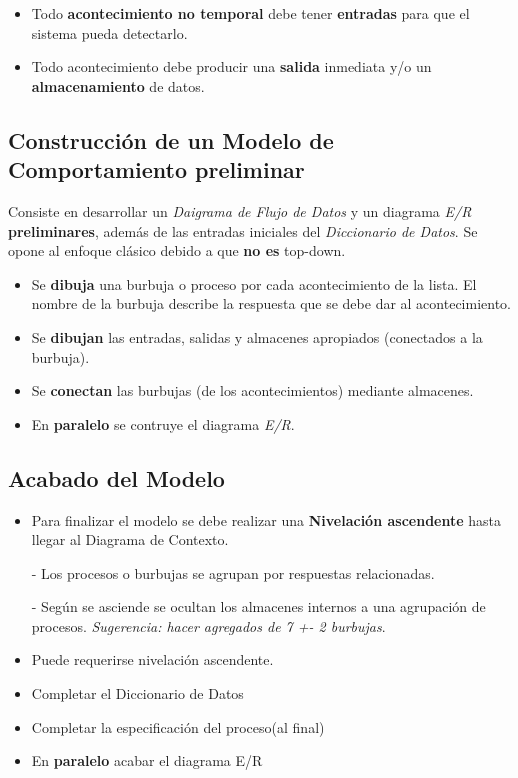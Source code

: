 \begin{itemize}[noitemsep]
\item Todo \textbf{acontecimiento no temporal} debe tener \textbf{entradas} para que el sistema pueda detectarlo.
\item Todo acontecimiento debe producir una \textbf{salida} inmediata y/o un \textbf{almacenamiento} de datos.
\end{itemize}


\subsection{Construcción de un Modelo de Comportamiento preliminar} %

Consiste en desarrollar un \textit{Daigrama de Flujo de Datos} y un diagrama \textit{E/R} \textbf{preliminares}, además de las entradas iniciales del \textit{Diccionario de Datos}. Se opone al enfoque clásico debido a que \textbf{no es} top-down.

\begin{itemize}[noitemsep]
\item Se \textbf{dibuja} una burbuja o proceso por cada acontecimiento de la lista. El nombre de la burbuja describe la respuesta que se debe dar al acontecimiento.
\item Se \textbf{dibujan} las entradas, salidas y almacenes apropiados (conectados a la burbuja).
\item Se \textbf{conectan} las burbujas (de los acontecimientos) mediante almacenes.
\item En \textbf{paralelo} se contruye el diagrama \textit{E/R}.
\end{itemize}


\subsection{Acabado del Modelo}

\begin{itemize}[noitemsep]
\item Para finalizar el modelo se debe realizar una \textbf{Nivelación ascendente} hasta llegar al Diagrama de Contexto.

  - Los procesos o burbujas se agrupan por respuestas relacionadas.

  - Según se asciende se ocultan los almacenes internos a una agrupación de procesos. \textit{Sugerencia: hacer agregados de 7 +- 2 burbujas}.

\item Puede requerirse nivelación ascendente.
\item Completar el Diccionario de Datos
\item Completar la especificación del proceso(al final)
\item En \textbf{paralelo} acabar el diagrama E/R
\end{itemize}
